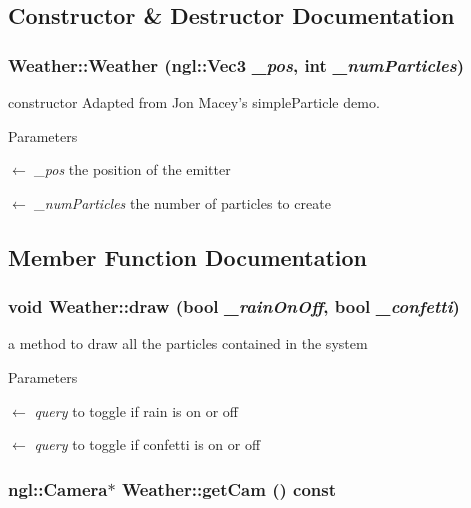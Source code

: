 \subsection{Constructor \& Destructor Documentation}
\hypertarget{classWeather_a148a749b4d95904c972e533d4aba3369}{
\subsubsection[{Weather}]{\setlength{\rightskip}{0pt plus 5cm}Weather::Weather (ngl::Vec3 {\em \_\-pos}, \/  int {\em \_\-numParticles})}}
\label{classWeather_a148a749b4d95904c972e533d4aba3369}


constructor Adapted from Jon Macey's simpleParticle demo.


\begin{DoxyParams}{Parameters}
\item[\mbox{$\leftarrow$} {\em \_\-pos}]the position of the emitter \item[\mbox{$\leftarrow$} {\em \_\-numParticles}]the number of particles to create \end{DoxyParams}


\subsection{Member Function Documentation}
\hypertarget{classWeather_a9a87fb547a7312e1c645b5c0e4ff580d}{
\subsubsection[{draw}]{\setlength{\rightskip}{0pt plus 5cm}void Weather::draw (bool {\em \_\-rainOnOff}, \/  bool {\em \_\-confetti})}}
\label{classWeather_a9a87fb547a7312e1c645b5c0e4ff580d}


a method to draw all the particles contained in the system 
\begin{DoxyParams}{Parameters}
\item[\mbox{$\leftarrow$} {\em query}]to toggle if rain is on or off \item[\mbox{$\leftarrow$} {\em query}]to toggle if confetti is on or off \end{DoxyParams}
\hypertarget{classWeather_a594b7ade4a05f1cfdc70480d562fbc71}{
\subsubsection[{getCam}]{\setlength{\rightskip}{0pt plus 5cm}ngl::Camera$\ast$ Weather::getCam () const}}
\label{classWeather_a594b7ade4a05f1cfdc70480d562fbc71}


